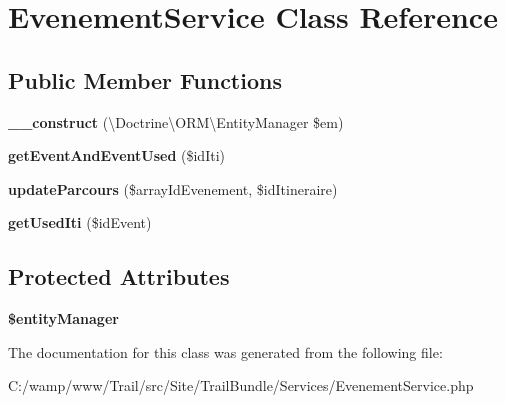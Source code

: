 \hypertarget{class_site_1_1_trail_bundle_1_1_services_1_1_evenement_service}{}\section{Evenement\+Service Class Reference}
\label{class_site_1_1_trail_bundle_1_1_services_1_1_evenement_service}
\subsection*{Public Member Functions}
\begin{DoxyCompactItemize}
\item 
\hypertarget{class_site_1_1_trail_bundle_1_1_services_1_1_evenement_service_ab2169482dc28d8878073284ee38f2aa2}{}{\bfseries \+\_\+\+\_\+construct} (\textbackslash{}Doctrine\textbackslash{}\+O\+R\+M\textbackslash{}\+Entity\+Manager \$em)\label{class_site_1_1_trail_bundle_1_1_services_1_1_evenement_service_ab2169482dc28d8878073284ee38f2aa2}

\item 
\hypertarget{class_site_1_1_trail_bundle_1_1_services_1_1_evenement_service_a886a4a164edb09e17e0413e5d0aa5980}{}{\bfseries get\+Event\+And\+Event\+Used} (\$id\+Iti)\label{class_site_1_1_trail_bundle_1_1_services_1_1_evenement_service_a886a4a164edb09e17e0413e5d0aa5980}

\item 
\hypertarget{class_site_1_1_trail_bundle_1_1_services_1_1_evenement_service_aa84310ef0e27fe302e340f108677de4a}{}{\bfseries update\+Parcours} (\$array\+Id\+Evenement, \$id\+Itineraire)\label{class_site_1_1_trail_bundle_1_1_services_1_1_evenement_service_aa84310ef0e27fe302e340f108677de4a}

\item 
\hypertarget{class_site_1_1_trail_bundle_1_1_services_1_1_evenement_service_afdae63e0e65b4b08b31f722677eca57d}{}{\bfseries get\+Used\+Iti} (\$id\+Event)\label{class_site_1_1_trail_bundle_1_1_services_1_1_evenement_service_afdae63e0e65b4b08b31f722677eca57d}

\end{DoxyCompactItemize}
\subsection*{Protected Attributes}
\begin{DoxyCompactItemize}
\item 
\hypertarget{class_site_1_1_trail_bundle_1_1_services_1_1_evenement_service_a63b09dd58f2dc54cd99c7ff4ddca9e7f}{}{\bfseries \$entity\+Manager}\label{class_site_1_1_trail_bundle_1_1_services_1_1_evenement_service_a63b09dd58f2dc54cd99c7ff4ddca9e7f}

\end{DoxyCompactItemize}


The documentation for this class was generated from the following file\+:\begin{DoxyCompactItemize}
\item 
C\+:/wamp/www/\+Trail/src/\+Site/\+Trail\+Bundle/\+Services/Evenement\+Service.\+php\end{DoxyCompactItemize}
